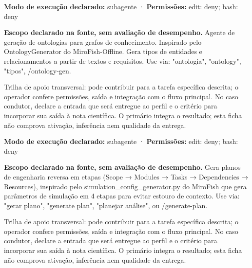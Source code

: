 \begin{arquitetura}
\textbf{Modo de execução declarado:} subagente · \textbf{Permissões:} edit: deny; bash: deny
\end{arquitetura}


\begin{descricao}
\textbf{Escopo declarado na fonte, sem avaliação de desempenho.}
Agente de geração de ontologias para grafos de conhecimento. Inspirado pelo OntologyGenerator do MiroFish-Offline. Gera tipos de entidades e relacionamentos a partir de textos e requisitos. Use via: "ontologia", "ontology", "tipos", /ontology-gen.
\end{descricao}

\begin{funcao}
Trilha de apoio transversal: pode contribuir para a tarefa específica descrita; o operador confere permissões, saída e integração com o fluxo principal. No caso condutor, declare a entrada que será entregue ao perfil e o critério para incorporar sua saída à nota científica. O primário integra o resultado; esta ficha não comprova ativação, inferência nem qualidade da entrega.
\end{funcao}

\begin{arquitetura}
\textbf{Modo de execução declarado:} subagente · \textbf{Permissões:} edit: deny; bash: deny
\end{arquitetura}


\begin{descricao}
\textbf{Escopo declarado na fonte, sem avaliação de desempenho.}
Gera planos de engenharia reversa em etapas (Scope → Modules → Tasks → Dependencies → Resources), inspirado pelo simulation\_config\_generator.py do MiroFish que gera parâmetros de simulação em 4 etapas para evitar estouro de contexto. Use via: "gerar plano", "generate plan", "planejar análise", ou /generate-plan.
\end{descricao}

\begin{funcao}
Trilha de apoio transversal: pode contribuir para a tarefa específica descrita; o operador confere permissões, saída e integração com o fluxo principal. No caso condutor, declare a entrada que será entregue ao perfil e o critério para incorporar sua saída à nota científica. O primário integra o resultado; esta ficha não comprova ativação, inferência nem qualidade da entrega.
\end{funcao}

